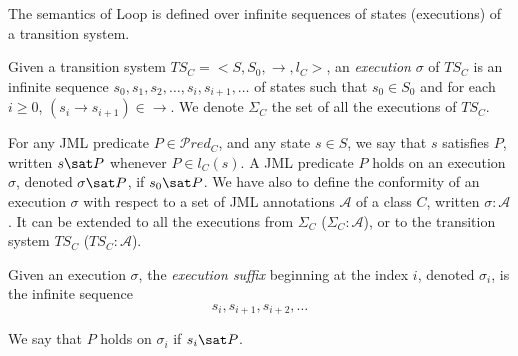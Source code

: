 The semantics of \textsf{Loop} is defined over infinite sequences of states
(executions) of a transition system.
\begin{definition}[Execution]
\label{def-TSexec}
Given a transition system \(TS_C = <S, S_0, \rightarrow, l_C>\), an
\emph{execution} $\sigma$  of $TS_C$ is an infinite sequence
$s_0, s_1, s_2, \ldots , s_i, s_{i+1}, \ldots$ of
states such that $s_0 \in S_0$ 
and for each $i \ge 0$, $(s_i \xrightarrow{} s_{i+1}) \in \rightarrow$. 
We denote $\Sigma_C$ the set of all the executions of $TS_C$.
\end{definition}
For any JML predicate \(P \in\mathcal{P}red_C\), and any state \(s \in
S\), we say that $s$ satisfies $P$, written \(s\sat P\) 
whenever \(P \in l_C(s)\). 
A JML predicate \(P\) holds on an execution \(\sigma\), denoted \(\sigma
\sat P\), if \(s_0 \sat P\).
We have also to define the conformity of an execution $\sigma$
with respect to a set of JML annotations $\mathcal{A}$ of a class $C$,
written $\sigma : \mathcal{A}$. It can be extended to all the executions
from $\Sigma_C$ ($\Sigma_C :  \mathcal{A}$), or to the transition system
$TS_C$ ($TS_C : \mathcal{A}$).  
 
\begin{definition}
Given an execution \(\sigma\), the \emph{execution suffix} beginning
at the index $i$, denoted \(\sigma_i\), is the infinite sequence
\[ s_i , s_{i+1} , s_{i+2}, \ldots \]

\end{definition}

We say that \(P\) holds on \(\sigma_i\) %
if \(s_i \sat P\). 







